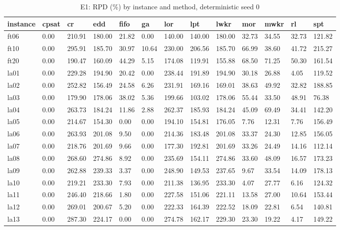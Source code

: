 \begin{table}[htbp]
\centering
\caption{E1: RPD (\%) by instance and method, deterministic seed 0}
\label{tab:ch6-e1-rpd-summary}
\begin{tabular}{lllllllllllll}
\toprule
instance & cpsat & cr & edd & fifo & ga & lor & lpt & lwkr & mor & mwkr & rl & spt \\
\midrule
ft06 & 0.00 & 210.91 & 180.00 & 21.82 & 0.00 & 140.00 & 140.00 & 180.00 & 32.73 & 34.55 & 32.73 & 121.82 \\
ft10 & 0.00 & 295.91 & 185.70 & 30.97 & 10.64 & 230.00 & 206.56 & 185.70 & 66.99 & 38.60 & 41.72 & 215.27 \\
ft20 & 0.00 & 190.47 & 160.09 & 44.29 & 5.15 & 174.08 & 119.91 & 155.88 & 68.50 & 71.25 & 50.30 & 161.54 \\
la01 & 0.00 & 229.28 & 194.90 & 20.42 & 0.00 & 238.44 & 191.89 & 194.90 & 30.18 & 26.88 & 4.05 & 119.52 \\
la02 & 0.00 & 252.82 & 156.49 & 24.58 & 6.26 & 231.91 & 169.16 & 169.01 & 38.63 & 49.92 & 32.82 & 188.85 \\
la03 & 0.00 & 179.90 & 178.06 & 38.02 & 5.36 & 199.66 & 103.02 & 178.06 & 55.44 & 33.50 & 48.91 & 76.38 \\
la04 & 0.00 & 263.73 & 184.24 & 11.86 & 2.88 & 262.37 & 185.93 & 184.24 & 45.09 & 69.49 & 34.41 & 142.20 \\
la05 & 0.00 & 214.67 & 154.30 & 0.00 & 0.00 & 194.10 & 154.81 & 176.05 & 7.76 & 12.31 & 7.76 & 156.49 \\
la06 & 0.00 & 263.93 & 201.08 & 9.50 & 0.00 & 214.36 & 183.48 & 201.08 & 33.37 & 24.30 & 12.85 & 156.05 \\
la07 & 0.00 & 218.76 & 201.69 & 9.66 & 0.00 & 177.30 & 192.81 & 201.69 & 33.26 & 24.49 & 14.16 & 112.14 \\
la08 & 0.00 & 268.60 & 274.86 & 8.92 & 0.00 & 235.69 & 154.11 & 274.86 & 33.60 & 48.09 & 16.57 & 173.23 \\
la09 & 0.00 & 262.88 & 239.33 & 3.37 & 0.00 & 248.90 & 149.53 & 237.65 & 9.67 & 33.54 & 14.09 & 178.13 \\
la10 & 0.00 & 219.21 & 233.30 & 7.93 & 0.00 & 211.38 & 136.95 & 233.30 & 4.07 & 27.77 & 6.16 & 124.32 \\
la11 & 0.00 & 246.40 & 218.66 & 1.80 & 0.00 & 227.58 & 151.06 & 221.11 & 13.58 & 27.00 & 10.64 & 153.44 \\
la12 & 0.00 & 269.01 & 200.67 & 5.20 & 0.00 & 222.33 & 164.39 & 222.52 & 18.09 & 22.81 & 6.54 & 140.81 \\
la13 & 0.00 & 287.30 & 224.17 & 0.00 & 0.00 & 274.78 & 162.17 & 229.30 & 23.30 & 19.22 & 4.17 & 149.22 \\

\end{tabular}
\end{table}
